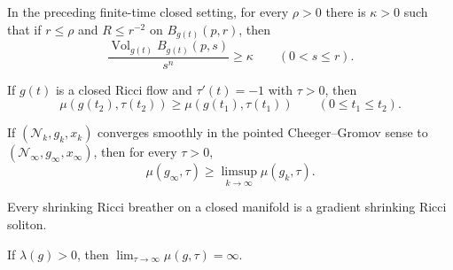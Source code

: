 \begin{theorem}
\label{thm:chow-ii-appd-improved-no-local-collapsing}
In the preceding finite-time closed setting, for every $\rho>0$ there is
$\kappa>0$ such that if $r\leq\rho$ and $R\leq r^{-2}$ on
$B_{g(t)}(p,r)$, then
\[
 \frac{\operatorname{Vol}_{g(t)}B_{g(t)}(p,s)}{s^n}\geq\kappa
 \qquad(0<s\leq r).
\]
\end{theorem}

\begin{lemma}
\label{lem:chow-ii-appd-mu-monotonicity}
If $g(t)$ is a closed Ricci flow and $\tau'(t)=-1$ with $\tau>0$, then
\[
 \mu(g(t_2),\tau(t_2))\geq\mu(g(t_1),\tau(t_1))
 \qquad(0\leq t_1\leq t_2).
\]
\end{lemma}

\begin{lemma}
\label{lem:chow-ii-appd-mu-cheeger-gromov}
If $(\mathcal N_k,g_k,x_k)$ converges smoothly in the pointed
Cheeger--Gromov sense to $(\mathcal N_\infty,g_\infty,x_\infty)$, then for
every $\tau>0$,
\[
 \mu(g_\infty,\tau)\geq\limsup_{k\to\infty}\mu(g_k,\tau).
\]
\end{lemma}

\begin{theorem}
\label{thm:chow-ii-appd-shrinking-breathers}
Every shrinking Ricci breather on a closed manifold is a gradient shrinking
Ricci soliton.
\end{theorem}

\begin{lemma}
\label{lem:chow-ii-appd-mu-large-tau}
If $\lambda(g)>0$, then $\lim_{\tau\to\infty}\mu(g,\tau)=\infty$.
\end{lemma}

